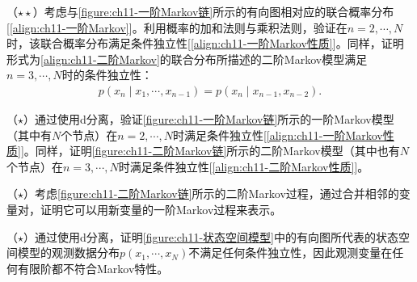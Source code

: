 \documentclass[../../main.tex]{subfiles}
\begin{document}
\begin{exercise}\label{exercise:ch11-16}
（$\star\star$）考虑与\cref{figure:ch11-一阶Markov链}所示的有向图相对应的联合概率分布[\eqref{align:ch11-一阶Markov}]。利用概率的加和法则与乘积法则，验证在$n=2,\cdots,N$时，该联合概率分布满足条件独立性[\eqref{align:ch11-一阶Markov性质}]。同样，证明形式为\eqref{align:ch11-二阶Markov}的联合分布所描述的二阶Markov模型满足$n=3,\cdots,N$时的条件独立性：
\begin{align}
  p(x_n\mid x_1,\cdots,x_{n-1}) = p(x_n\mid x_{n-1},x_{n-2}).
  \label{align:ch11-二阶Markov性质}
\end{align}
\end{exercise}

\begin{exercise}\label{exercise:ch11-17}
（$\star$）通过使用d分离，验证\cref{figure:ch11-一阶Markov链}所示的一阶Markov模型（其中有$N$个节点）在$n=2,\cdots,N$时满足条件独立性[\eqref{align:ch11-一阶Markov性质}]。同样，证明\cref{figure:ch11-二阶Markov链}所示的二阶Markov模型（其中也有$N$个节点）在$n=3,\cdots,N$时满足条件独立性[\eqref{align:ch11-二阶Markov性质}]。
\end{exercise}

\begin{exercise}\label{exercise:ch11-18}
（$\star$）考虑\cref{figure:ch11-二阶Markov链}所示的二阶Markov过程，通过合并相邻的变量对，证明它可以用新变量的一阶Markov过程来表示。
\end{exercise}

\begin{exercise}\label{exercise:ch11-19}
（$\star$）通过使用d分离，证明\cref{figure:ch11-状态空间模型}中的有向图所代表的状态空间模型的观测数据分布$p(x_1,\cdots,x_N)$不满足任何条件独立性，因此观测变量在任何有限阶都不符合Markov特性。
\end{exercise}
\end{document}
